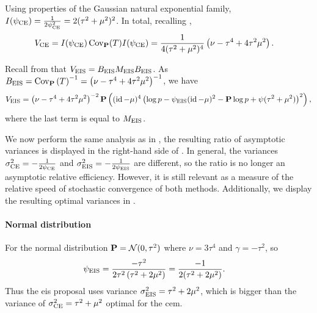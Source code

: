 \begin{example}
    \label{ex:avr-mu-fixed}
    
    Using properties of the Gaussian natural exponential family, $I(\pce) = \frac{1}{2\psi^{2}_\ce} = 2(\tau^{2} + \mu^{2})^{2}$. In total, recalling ,
    \begin{align}
        V_{\ce} &= I(\pce) \cov_{\P} (T) I(\pce) =\frac{1}{4 (\tau^{2} + \mu^{2})^{4}} \left( \nu - \tau^{4} + 4\tau^{2}\mu^{2} \right).
    \end{align}

    
    Recall from  that $V_{\eis} = B_{\eis} M_{\eis} B_{\eis}$.
    As $B_{\eis} = \cov_{\P} \left(T\right) ^{-1} = \left( \nu - \tau^{4} + 4 \tau^{2}\mu^{2} \right)^{-1}$, we have
    \begin{align*}
        V_{\eis} = \left( \nu - \tau^{4} + 4 \tau^{2}\mu^{2}\right)^{-2} \P \left( (\id - \mu)^{4} \left( \log p - \peis (\id - \mu)^{2} - \P \log p + \psi (\tau^{2} + \mu^{2}) \right)^{2} \right),
    \end{align*}
    where the last term is equal to $M_{\eis}$. 

    We now perform the same analysis as in , the resulting ratio of asymptotic variances is displayed in the right-hand side of . In general, the variances $\sigma^{2}_{\ce} = -\frac{1}{2\pce}$ and $\sigma^{2}_{\eis} = -\frac{1}{2\peis}$ are different, so the ratio is no longer an asymptotic relative efficiency. However, it is still relevant as a measure of the relative speed of stochastic convergence of both methods. Additionally, we display the resulting optimal variances in .

    \paragraph{Normal distribution}
    For the normal distribution $\P = \mathcal N (0, \tau^{2})$ where $\nu = 3 \tau^{4}$ and $\gamma = -\tau^{2}$, so 
    \begin{align*}
        \peis &= \frac{-\tau^{2}}{2\tau^{2} \left( \tau^{2} + 2\mu^{2} \right)} = \frac{-1}{2(\tau^{2} + 2\mu^{2})}.
    \end{align*}
    Thus the \gls{eis} proposal uses variance $\sigma^{2}_{\eis} = \tau^{2} + 2\mu^{2}$, which is bigger than the variance of $\sigma^{2}_{\ce} = \tau^{2} + \mu^{2}$ optimal for the \gls{cem}.


\end{example}
